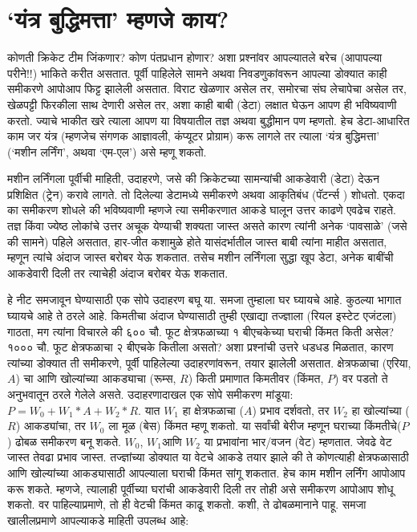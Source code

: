 \chapter{`यंत्र बुद्धिमत्ता' म्हणजे काय?}
कोणती क्रिकेट टीम जिंकणार? कोण पंतप्रधान होणार?  अशा प्रश्नांवर आपल्यातले बरेच (आपापल्या परीने!!) भाकिते करीत असतात. पूर्वी पाहिलेले सामने अथवा निवडणुकांवरून आपल्या डोक्यात काही समीकरणे आपोआप फिट्ट झालेली असतात. विराट खेळणार असेल तर, समोरचा संघ लेचापेचा असेल तर, खेळपट्टी फिरकीला साथ देणारी असेल तर, अशा काही बाबी (डेटा) लक्षात घेऊन आपण ही भविष्यवाणी करतो. ज्याचे भाकीत खरे त्याला आपण या विषयातील तज्ञ अथवा बुद्धीमान पण म्हणतो. हेच डेटा-आधारित  काम जर यंत्र (म्हणजेच संगणक आज्ञावली, कंप्यूटर प्रोग्राम) करू लागले तर त्याला `यंत्र बुद्धिमत्ता' (`मशीन लर्निंग', अथवा `एम-एल') असे म्हणू शकतो.

मशीन लर्निंगला पूर्वीची माहिती, उदाहरणे, जसे की क्रिकेटच्या सामन्यांची आकडेवारी (डेटा) देऊन प्रशिक्षित (ट्रेन) करावे लागते. तो दिलेल्या डेटामध्ये समीकरणे अथवा आकृतिबंध (पॅटर्न्स ) शोधतो. एकदा का समीकरण शोधले की भविष्यवाणी म्हणजे त्या समीकरणात आकडे घालून उत्तर काढणे एवढेच राहते. तज्ञ किंवा ज्येष्ठ लोकांचे उत्तर अचूक येण्याची शक्यता जास्त असते कारण त्यांनी अनेक `पावसाळे' (जसे की सामने) पहिले असतात, हार-जीत कशामुळे होते यासंदर्भातील जास्त बाबी त्यांना माहीत असतात, म्हणून त्यांचे अंदाज जास्त बरोबर येऊ शकतात. तसेच मशीन लर्निंगला सुद्धा खूप डेटा, अनेक बाबींची आकडेवारी दिली तर त्याचेही अंदाज बरोबर येऊ शकतात.

हे नीट समजावून घेण्यासाठी एक सोपे उदाहरण बघू या. समजा तुम्हाला घर घ्यायचे आहे. कुठल्या भागात घ्यायचे आहे ते ठरले आहे. किमतीचा अंदाज घेण्यासाठी तुम्ही एखाद्या तज्ज्ञाला (रियल इस्टेट एजंटला) गाठता, मग त्यांना विचारले की ६०० चौ. फूट क्षेत्रफळाच्या १  बीएचकेच्या घराची किंमत किती असेल? १००० चौ. फूट क्षेत्रफळाचा २ बीएचके कितीला असतो? अशा प्रश्नांची उत्तरे धडधड मिळतात, कारण त्यांच्या डोक्यात ती समीकरणे, पूर्वी पाहिलेल्या उदाहरणांवरून, तयार झालेली असतात. क्षेत्रफळाचा (एरिया, $A$) चा आणि खोल्यांच्या आकड्याचा (रूम्स, $R$) किती प्रमाणात किमतीवर (किंमत, $P$) वर पडतो ते अनुभवातून ठरले गेलेले असते. उदाहरणादाखल एक सोपे समीकरण मांडूया: $P = W_0 + W_1 * A + W_2 * R$. यात $W_1$ हा क्षेत्रफळाचा ($A$) प्रभाव दर्शवतो, तर $W_2$ हा खोल्यांच्या ($R$) आकड्यांचा, तर $W_0$ ला मूळ (बेस) किंमत म्हणू शकतो. या सर्वांची बेरीज म्हणून घराच्या किंमतीचे($P$) ढोबळ समीकरण बनू शकते. $W_0$, $W_1 $आणि $W_2$ या प्रभावांना  भार/वजन  (वेट) म्हणतात. जेवढे वेट जास्त तेवढा प्रभाव जास्त. तज्ज्ञांच्या डोक्यात या वेटचे आकडे तयार झाले की ते कोणत्याही क्षेत्रफळासाठी आणि खोल्यांच्या आकड्यासाठी आपल्याला घराची किंमत सांगू शकतात. हेच काम मशीन लर्निंग आपोआप करू शकते. म्हणजे, त्यालाही पूर्वीच्या घरांची आकडेवारी दिली तर तोही असे समीकरण आपोआप शोधू शकतो. वर पाहिल्याप्रमाणे, तो ही वेटची किंमत काढू शकतो. कशी, ते ढोबळमानाने पाहू. समजा खालीलप्रमाणे आपल्याकडे माहिती उपलब्ध आहे:

